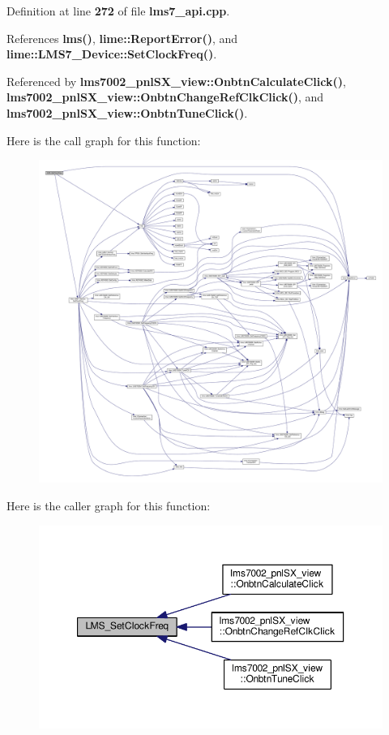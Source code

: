 Definition at line {\bf 272} of file {\bf lms7\+\_\+api.\+cpp}.



References {\bf lms()}, {\bf lime\+::\+Report\+Error()}, and {\bf lime\+::\+L\+M\+S7\+\_\+\+Device\+::\+Set\+Clock\+Freq()}.



Referenced by {\bf lms7002\+\_\+pnl\+S\+X\+\_\+view\+::\+Onbtn\+Calculate\+Click()}, {\bf lms7002\+\_\+pnl\+S\+X\+\_\+view\+::\+Onbtn\+Change\+Ref\+Clk\+Click()}, and {\bf lms7002\+\_\+pnl\+S\+X\+\_\+view\+::\+Onbtn\+Tune\+Click()}.



Here is the call graph for this function\+:
\nopagebreak
\begin{figure}[H]
\begin{center}
\leavevmode
\includegraphics[width=350pt]{df/de1/lms7__api_8cpp_af73c9ae3c39c8e5843b2ee6fb4774ec2_cgraph}
\end{center}
\end{figure}




Here is the caller graph for this function\+:
\nopagebreak
\begin{figure}[H]
\begin{center}
\leavevmode
\includegraphics[width=350pt]{df/de1/lms7__api_8cpp_af73c9ae3c39c8e5843b2ee6fb4774ec2_icgraph}
\end{center}
\end{figure}


